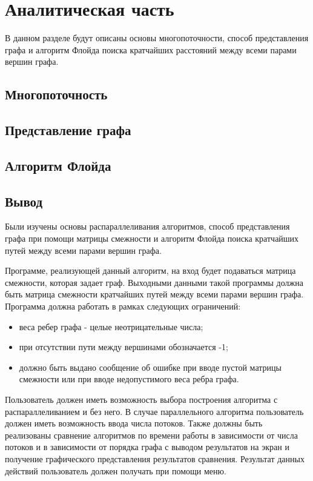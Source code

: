 \chapter{Аналитическая часть}

В данном разделе будут описаны основы многопоточности, способ представления графа и алгоритм Флойда поиска кратчайших расстояний между всеми парами вершин графа.

\section{Многопоточность}

\section{Представление графа}

\section{Алгоритм Флойда}

\section{Вывод}

Были изучены основы распараллеливания алгоритмов, способ представления графа при помощи матрицы смежности и алгоритм Флойда поиска кратчайших путей между всеми парами вершин графа.

Программе, реализующей данный алгоритм, на вход будет подаваться матрица смежности, которая задает граф. Выходными данными такой программы должна быть матрица смежности кратчайших путей между всеми парами вершин графа. Программа должна работать в рамках следующих ограничений:

\begin{itemize}
	\item веса ребер графа - целые неотрицательные числа;
	\item при отсутствии пути между вершинами обозначается -1;
	\item должно быть выдано сообщение об ошибке при вводе пустой матрицы смежности или при вводе недопустимого веса ребра графа.
\end{itemize}

Пользователь должен иметь возможность выбора построения алгоритма с распараллеливанием и без него. В случае параллельного алгоритма пользователь должен иметь возможность ввода числа потоков. Также должны быть реализованы сравнение алгоритмов по времени работы в зависимости от числа потоков и в зависимости от порядка графа с выводом результатов на экран и получение графического представления результатов сравнения. Результат данных действий пользователь должен получать при помощи меню.